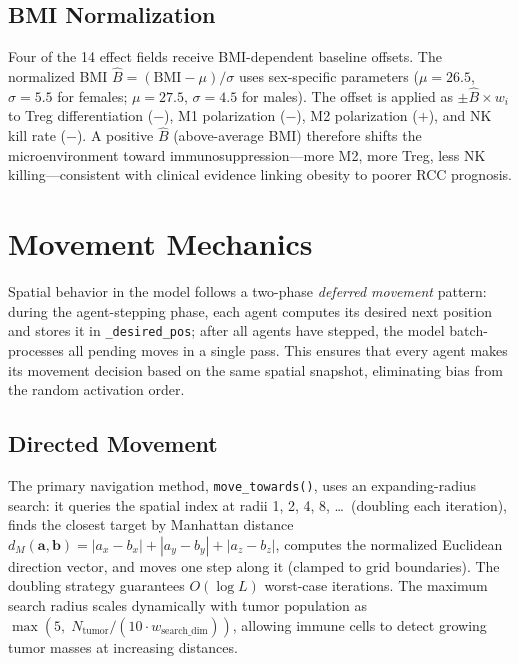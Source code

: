 \subsection{BMI Normalization}
\label{subsec:md_bmi}

Four of the 14 effect fields receive BMI-dependent baseline offsets.  The normalized BMI $\hat{B} = (\text{BMI} - \mu)/\sigma$ uses sex-specific parameters ($\mu = 26.5$, $\sigma = 5.5$ for females; $\mu = 27.5$, $\sigma = 4.5$ for males).  The offset is applied as $\pm\hat{B} \times w_i$ to Treg differentiation ($-$), M1 polarization ($-$), M2 polarization ($+$), and NK kill rate ($-$).  A positive $\hat{B}$ (above-average BMI) therefore shifts the microenvironment toward immunosuppression---more M2, more Treg, less NK killing---consistent with clinical evidence linking obesity to poorer RCC prognosis.

\section{Movement Mechanics}
\label{sec:md_movement}

Spatial behavior in the model follows a two-phase \emph{deferred movement} pattern: during the agent-stepping phase, each agent computes its desired next position and stores it in \texttt{\_desired\_pos}; after all agents have stepped, the model batch-processes all pending moves in a single pass.  This ensures that every agent makes its movement decision based on the same spatial snapshot, eliminating bias from the random activation order.

\subsection{Directed Movement}
\label{subsec:md_directed}

The primary navigation method, \texttt{move\_towards()}, uses an expanding-radius search: it queries the spatial index at radii 1, 2, 4, 8, \ldots\ (doubling each iteration), finds the closest target by Manhattan distance $d_M(\mathbf{a}, \mathbf{b}) = |a_x - b_x| + |a_y - b_y| + |a_z - b_z|$, computes the normalized Euclidean direction vector, and moves one step along it (clamped to grid boundaries).  The doubling strategy guarantees $O(\log L)$ worst-case iterations.  The maximum search radius scales dynamically with tumor population as $\max(5,\; N_{\text{tumor}} / (10 \cdot w_{\text{search\_dim}}))$, allowing immune cells to detect growing tumor masses at increasing distances.

